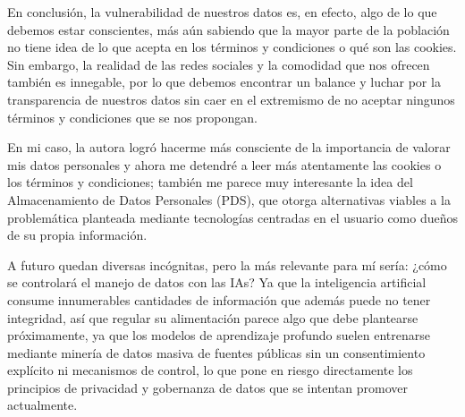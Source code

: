 En conclusión, la vulnerabilidad de nuestros datos es, en efecto, algo de lo que debemos estar conscientes, más aún sabiendo que la mayor parte de la población no tiene idea de lo que acepta en los términos y condiciones o qué son las cookies. Sin embargo, la realidad de las redes sociales y la comodidad que nos ofrecen también es innegable, por lo que debemos encontrar un balance y luchar por la transparencia de nuestros datos sin caer en el extremismo de no aceptar ningunos términos y condiciones que se nos propongan. 

En mi caso, la autora logró hacerme más consciente de la importancia de valorar mis datos personales y ahora me detendré a leer más atentamente las cookies o los términos y condiciones; también me parece muy interesante la idea del Almacenamiento de Datos Personales (PDS), que otorga alternativas viables a la problemática planteada mediante tecnologías centradas en el usuario como dueños de su propia información.

A futuro quedan diversas incógnitas, pero la más relevante para mí sería: ¿cómo se controlará el manejo de datos con las IAs? Ya que la inteligencia artificial consume innumerables cantidades de información que además puede no tener integridad, así que regular su alimentación parece algo que debe plantearse próximamente, ya que los modelos de aprendizaje profundo suelen entrenarse mediante minería de datos masiva de fuentes públicas sin un consentimiento explícito ni mecanismos de control, lo que pone en riesgo directamente los principios de privacidad y gobernanza de datos que se intentan promover actualmente.
